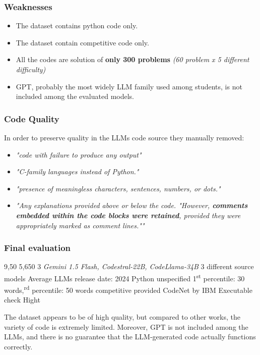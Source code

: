 \subsubsection*{Weaknesses}
\begin{itemize}
    \item The dataset contains python code only.
    \item The dataset contain competitive code only.
    \item All the codes are solution of \textbf{only 300 problems} 
    \textit{(60 problem x 5 different difficulty)}
    \item GPT, probably the most widely LLM family 
    used among students, is not 
    included among the evaluated models.
\end{itemize}


\subsubsection*{Code Quality}
In order to preserve quality in the LLMs code source they manually removed:
\begin{itemize}
    \item \textit{"code with failure to produce any output"}
    \item \textit{"C-family languages instead of Python."}
    \item \textit{"presence of meaningless characters, sentences, numbers, or dots."}
    \item \textit{"Any explanations provided above or below the code.
    "However, \textbf{comments embedded within the code blocks were retained}, provided they were 
    appropriately marked as comment lines.""}
\end{itemize}


\subsubsection*{Final evaluation}


\expandafter\def\csname AIGCodeSetHumanCode\endcsname{9,50}
\expandafter\def\csname AIGCodeSetLLMCode\endcsname{5,650}
\expandafter\def\csname AIGCodeSetNumLLMs\endcsname{3 \textit{Gemini 1.5 Flash, Codestral-22B, CodeLlama-34B}}
\expandafter\def\csname AIGCodeSetLLMDiversity\endcsname{3 different source models}
\expandafter\def\csname AIGCodeSetCurrentUse\endcsname{Average LLMs release date: 2024}
\expandafter\def\csname AIGCodeSetLanguages\endcsname{Python}
\expandafter\def\csname AIGCodeSetCodeTypes\endcsname{unspecified}
\expandafter\def\csname AIGCodeSetCodeSize\endcsname{1\textsuperscript{st} percentile: 30 words,\textsuperscript{rd} percentile: 50 words}
\expandafter\def\csname AIGCodeSetCodeContext\endcsname{competitive}
\expandafter\def\csname AIGCodeSetPrompts\endcsname{provided}
\expandafter\def\csname AIGCodeSetSources\endcsname{CodeNet by IBM \cite{puri2021codenet}}
\expandafter\def\csname AIGCodeSetCodeQuality\endcsname{Executable check}
\expandafter\def\csname AIGCodeSetReliability\endcsname{Hight}




The dataset appears to be of high quality, but compared to other works, 
the variety of code is extremely limited.
Moreover, GPT is not included among the LLMs, and there is no guarantee that 
the LLM-generated code actually functions correctly.